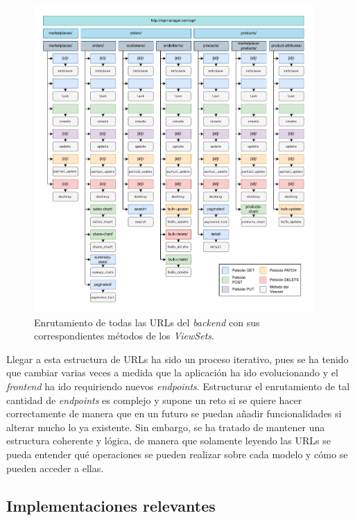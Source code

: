 \begin{figure}
    \centering
    \includegraphics[width=0.95\textwidth]{figures/design_develop/estructura_urls.pdf}
    \caption{Enrutamiento de todas las URLs del \textit{backend} con sus correspondientes métodos de los \textit{ViewSets}.}
    \label{dev:fig:estructura_urls}
\end{figure}

Llegar a esta estructura de URLs ha sido un proceso iterativo, pues se ha tenido que cambiar varias veces a medida que la aplicación ha ido evolucionando y el \textit{frontend} ha ido requiriendo nuevos \textit{endpoints}. Estructurar el enrutamiento de tal cantidad de \textit{endpoints} es complejo y supone un reto si se quiere hacer correctamente de manera que en un futuro se puedan añadir funcionalidades si alterar mucho lo ya existente. Sin embargo, se ha tratado de mantener una estructura coherente y lógica, de manera que solamente leyendo las URLs se pueda entender qué operaciones se pueden realizar sobre cada modelo y cómo se pueden acceder a ellas.

\subsection{Implementaciones relevantes}
\label{dev:subsec:implementaciones_relevantes}

